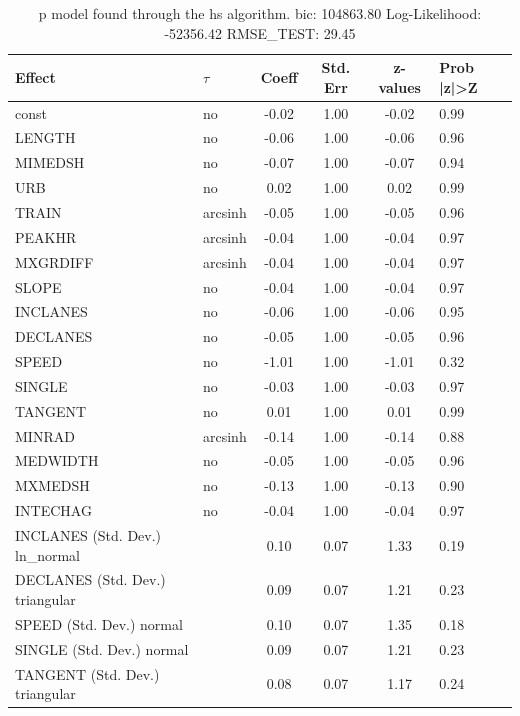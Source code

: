 \begin{table}
	\caption{p model found through the hs algorithm. bic: 104863.80 Log-Likelihood: -52356.42 RMSE_TEST: 29.45}
	\begin{center}
		\begin{tabular}{|l|l|c|c|c|l|}
			\hline
			Effect & $\tau$ & Coeff & Std. Err & z-values & Prob |z|>Z \\
			\hline
			const & no & -0.02 & 1.00 & -0.02 & 0.99 \\
			\hline
			LENGTH & no & -0.06 & 1.00 & -0.06 & 0.96 \\
			\hline
			MIMEDSH & no & -0.07 & 1.00 & -0.07 & 0.94 \\
			\hline
			URB & no & 0.02 & 1.00 & 0.02 & 0.99 \\
			\hline
			TRAIN & arcsinh & -0.05 & 1.00 & -0.05 & 0.96 \\
			\hline
			PEAKHR & arcsinh & -0.04 & 1.00 & -0.04 & 0.97 \\
			\hline
			MXGRDIFF & arcsinh & -0.04 & 1.00 & -0.04 & 0.97 \\
			\hline
			SLOPE & no & -0.04 & 1.00 & -0.04 & 0.97 \\
			\hline
			INCLANES & no & -0.06 & 1.00 & -0.06 & 0.95 \\
			\hline
			DECLANES & no & -0.05 & 1.00 & -0.05 & 0.96 \\
			\hline
			SPEED & no & -1.01 & 1.00 & -1.01 & 0.32 \\
			\hline
			SINGLE & no & -0.03 & 1.00 & -0.03 & 0.97 \\
			\hline
			TANGENT & no & 0.01 & 1.00 & 0.01 & 0.99 \\
			\hline
			MINRAD & arcsinh & -0.14 & 1.00 & -0.14 & 0.88 \\
			\hline
			MEDWIDTH & no & -0.05 & 1.00 & -0.05 & 0.96 \\
			\hline
			MXMEDSH & no & -0.13 & 1.00 & -0.13 & 0.90 \\
			\hline
			INTECHAG & no & -0.04 & 1.00 & -0.04 & 0.97 \\
			\hline
			INCLANES (Std. Dev.) ln_normal &  & 0.10 & 0.07 & 1.33 & 0.19 \\
			\hline
			DECLANES (Std. Dev.) triangular &  & 0.09 & 0.07 & 1.21 & 0.23 \\
			\hline
			SPEED (Std. Dev.) normal &  & 0.10 & 0.07 & 1.35 & 0.18 \\
			\hline
			SINGLE (Std. Dev.) normal &  & 0.09 & 0.07 & 1.21 & 0.23 \\
			\hline
			TANGENT (Std. Dev.) triangular &  & 0.08 & 0.07 & 1.17 & 0.24 \\

\end{tabular}
\end{center}
\end{table}
